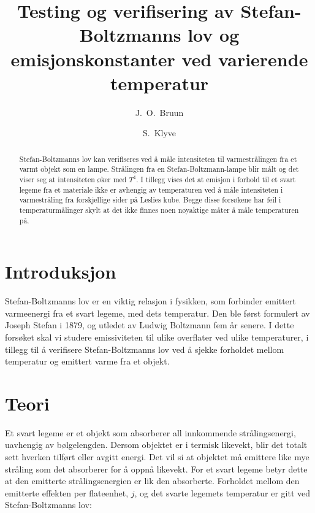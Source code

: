 \begin{frontmatter}

\title{Testing og verifisering av Stefan-Boltzmanns lov og emisjonskonstanter ved varierende temperatur}

\author{J.~O.~Bruun}
\author{S.~Klyve}

\begin{abstract}
Stefan-Boltzmanns lov kan verifiseres ved å måle intensiteten til varmestrålingen fra et varmt objekt som en lampe. Strålingen fra en Stefan-Boltzmann-lampe blir målt og det viser seg at intensiteten øker med $T^{4}$. I tillegg vises det at emisjon i forhold til et svart legeme fra et materiale ikke er avhengig av temperaturen ved å måle intensiteten i varmestråling fra forskjellige sider på Leslies kube. Begge disse forsøkene har feil i temperaturmålinger skylt at det ikke finnes noen nøyaktige måter å måle temperaturen på.
\end{abstract}

\end{frontmatter}


\section{Introduksjon}
Stefan-Boltzmanns lov er en viktig relasjon i fysikken, som forbinder emittert varmeenergi  fra et svart legeme, med dets temperatur. Den ble først formulert av Joseph Stefan i 1879, og utledet av Ludwig Boltzmann fem år senere\cite{SB}. I dette forsøket skal vi studere emissiviteten til ulike overflater ved ulike temperaturer, i tillegg til å verifisere Stefan-Boltzmanns lov ved å sjekke forholdet mellom temperatur og emittert varme fra et objekt.

\section{Teori}
Et svart legeme er et objekt som absorberer all innkommende strålingsenergi, uavhengig av bølgelengden. Dersom objektet er i termisk likevekt, blir det totalt sett hverken tilført eller avgitt energi. Det vil si at objektet må emittere like mye stråling som det absorberer for å oppnå likevekt. For et svart legeme betyr dette at den emitterte strålingsenergien er lik den absorberte. Forholdet mellom den emitterte effekten per flateenhet, $j$, og det svarte legemets temperatur er gitt ved Stefan-Boltzmanns lov:

